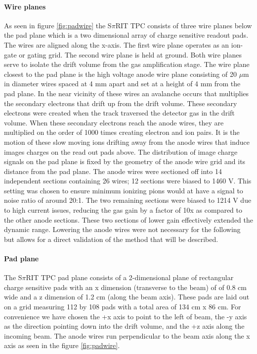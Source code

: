 \documentclass[review]{elsarticle}
\begin{document}
\paragraph{Wire planes}
As seen in figure \ref{fig:padwire} the S$\pi$RIT TPC consists of three wire planes below the pad plane which is a two dimensional array of charge sensitive readout pads. The wires are aligned along the x-axis. The first wire plane operates as an ion-gate or gating grid. The second wire plane is held at ground. Both wire planes serve to isolate the drift volume from the gas amplification stage. The wire plane closest to the pad plane is the high voltage anode wire plane consisting of 20 $\mu$m in diameter wires spaced at 4 mm apart and set at a height of 4 mm from the pad plane. In the near vicinity of these wires an avalanche  occurs that multiplies the secondary electrons that drift up from the drift volume. These secondary electrons were created when the track traversed the detector gas in the drift volume. When these secondary electrons reach the anode wires, they are multiplied on the order of 1000 times creating electron and ion pairs. It is the motion of these slow moving ions drifting away from the anode wires that induce images charges on the read out pads above. The distribution of image charge signals on the pad plane is fixed by the geometry of the anode wire grid and its distance from the pad plane. The anode wires were sectioned off into 14 independent sections containing 26 wires; 12 sections were biased to 1460 V. This setting was chosen to ensure  minimum ionizing pions would at have a signal to noise ratio of around 20:1. The two remaining sections were biased to 1214 V due to high current issues, reducing the gas gain by a factor of 10x as compared to the other anode sections. These two sections of lower gain effectively extended the dynamic range. Lowering the anode wires were not necessary for the following but allows for a direct validation of the method that will be described. 

\paragraph{Pad plane} 
The S$\pi$RIT TPC pad plane consists of a 2-dimensional plane of rectangular charge sensitive pads with an x dimension (transverse to the beam) of of 0.8 cm wide and a z dimension of 1.2 cm (along the beam axis). These pads are laid out on a grid measuring 112 by 108 pads with a total area of 134 cm x 86 cm. For convenience we have chosen the +x axis to point to the left of beam, the -y axis as the direction pointing down into the drift volume, and the +z axis along the incoming beam. The anode wires run perpendicular to the beam axis along the x axis as seen in the figure \ref{fig:padwire}. 
\end{document}
